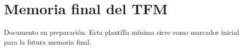 \documentclass[11pt,a4paper]{article}
\begin{document}
\section*{Memoria final del TFM}
Documento en preparación. Esta plantilla mínima sirve como marcador inicial para la futura memoria final.
\end{document}
